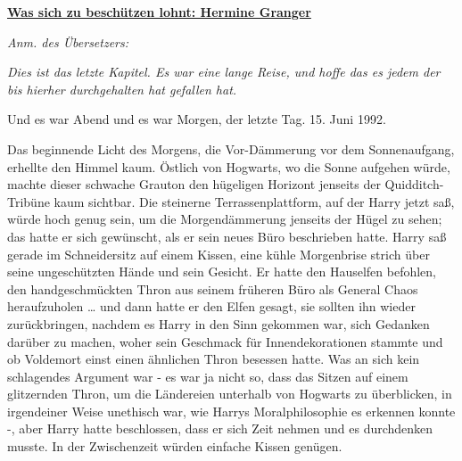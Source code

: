 

\hypertarget{was-sich-zu-beschuxfctzen-lohnt-hermine-granger}{%

\textbf{\uline{Was sich zu beschützen lohnt: Hermine Granger}}

\emph{Anm. des Übersetzers:}

\emph{Dies ist das letzte Kapitel. Es war eine lange Reise, und hoffe das es jedem der bis hierher durchgehalten hat gefallen hat.}

Und es war Abend und es war Morgen, der letzte Tag. 15. Juni 1992.

Das beginnende Licht des Morgens, die Vor-Dämmerung vor dem Sonnenaufgang, erhellte den Himmel kaum. Östlich von Hogwarts, wo die Sonne aufgehen würde, machte dieser schwache Grauton den hügeligen Horizont jenseits der Quidditch-Tribüne kaum sichtbar. Die steinerne Terrassenplattform, auf der Harry jetzt saß, würde hoch genug sein, um die Morgendämmerung jenseits der Hügel zu sehen; das hatte er sich gewünscht, als er sein neues Büro beschrieben hatte. Harry saß gerade im Schneidersitz auf einem Kissen, eine kühle Morgenbrise strich über seine ungeschützten Hände und sein Gesicht. Er hatte den Hauselfen befohlen, den handgeschmückten Thron aus seinem früheren Büro als General Chaos heraufzuholen … und dann hatte er den Elfen gesagt, sie sollten ihn wieder zurückbringen, nachdem es Harry in den Sinn gekommen war, sich Gedanken darüber zu machen, woher sein Geschmack für Innendekorationen stammte und ob Voldemort einst einen ähnlichen Thron besessen hatte. Was an sich kein schlagendes Argument war - es war ja nicht so, dass das Sitzen auf einem glitzernden Thron, um die Ländereien unterhalb von Hogwarts zu überblicken, in irgendeiner Weise unethisch war, wie Harrys Moralphilosophie es erkennen konnte -, aber Harry hatte beschlossen, dass er sich Zeit nehmen und es durchdenken musste. In der Zwischenzeit würden einfache Kissen genügen.

}
